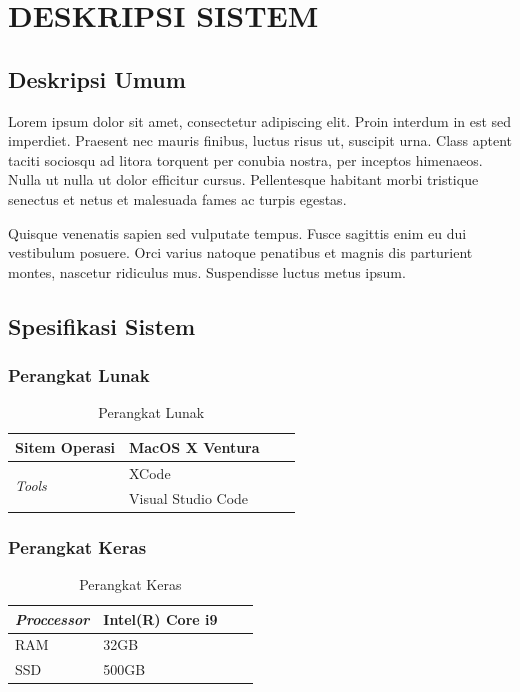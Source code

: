 \chapter{DESKRIPSI SISTEM}

\section{Deskripsi Umum}

Lorem ipsum dolor sit amet, consectetur adipiscing elit. Proin interdum in est sed imperdiet. Praesent nec mauris finibus, luctus risus ut, suscipit urna. Class aptent taciti sociosqu ad litora torquent per conubia nostra, per inceptos himenaeos. Nulla ut nulla ut dolor efficitur cursus. Pellentesque habitant morbi tristique senectus et netus et malesuada fames ac turpis egestas.

Quisque venenatis sapien sed vulputate tempus. Fusce sagittis enim eu dui vestibulum posuere. Orci varius natoque penatibus et magnis dis parturient montes, nascetur ridiculus mus. Suspendisse luctus metus ipsum.

\section{Spesifikasi Sistem}
\subsection{Perangkat Lunak}
\begin{table}[ht!]
    \centering
    \begin{tabular}{|l|l|l|l|}
        \hline
        Sitem Operasi                   & MacOS X Ventura    \\ \hline
        \multirow{2}{*}{\textit{Tools}} & XCode              \\ \cline{2-2}
                                        & Visual Studio Code \\ \hline
    \end{tabular}
    \caption{Perangkat Lunak}
    \label{tab:softwareUsed}
\end{table}

\subsection{Perangkat Keras}
\begin{table}[ht!]
    \centering
    \begin{tabular}{|l|l|l|l|}
        \hline
        \textit{Proccessor} & Intel(R) Core i9 \\ \hline
        RAM                 & 32GB             \\ \hline
        SSD                 & 500GB            \\ \hline
    \end{tabular}
    \caption{Perangkat Keras}
    \label{tab:hardwareUsed}
\end{table}

